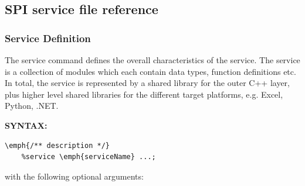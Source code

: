 \newpage
\subsection{SPI service file reference}

\subsubsection{Service Definition} \label{service}

The service command defines the overall characteristics of the service. The service is a collection of modules which each contain data types, function definitions etc. In total, the service is represented by a shared library for the outer C++ layer, plus higher level shared libraries for the different target platforms, e.g. Excel, Python, .NET.

\textbf{SYNTAX:}
\nopagebreak
\begin{Verbatim}[commandchars=\\\{\}]
    \emph{/** description */}
    %service \emph{serviceName} ...;
\end{Verbatim}

with the following optional arguments:


\small

